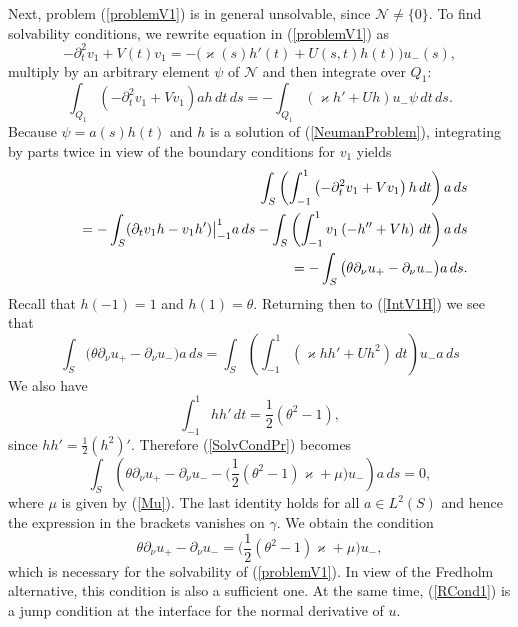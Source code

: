 \documentclass[graybox]{svmult}
\renewcommand{\kappa}{\varkappa}
\newcommand{\eqref}[1]{(\ref{#1})}
\newcommand{\pte}{\partial_t}
\begin{document}
Next, problem \eqref{problemV1} is in general unsolvable, since $\mathcal{N}\neq\{0\}$.  To find solvabi\-li\-ty conditions, we rewrite  equation in \eqref{problemV1} as
\begin{equation}\label{eqnV1Expand}
  -\pte^2 v_1+V(t)v_1=-\big(\kappa(s)h'(t)+U(s,t)h(t)\big)u_-(s),
\end{equation}
multiply  by an arbitrary element $\psi$ of  $\mathcal{N}$  and then integrate over $Q_1$:
\begin{equation}\label{IntV1H}
\int_{Q_1}\left(-\pte^2 v_1+Vv_1\right)ah\,dt\,ds=
-\int_{Q_1}(\kappa h'+Uh )u_-\psi\, dt\,ds.
\end{equation}
Because $\psi=a(s)h(t)$ and $h$ is a solution of \eqref{NeumanProblem}, integrating by parts twice  in view of the boundary conditions for $v_1$ yields
\begin{eqnarray}\nonumber
&&\int_{S} \left(\int_{-1}^1\left(-\pte^2 v_1+Vv_1\right)h\,dt \right) a\,ds\\\nonumber
&&\kern12pt=-\int_{S}( \partial_tv_1 h-v_1 h')\big|_{-1}^1a\,ds-
\int_{S} \left(\int_{-1}^1 v_1\left(-h''+Vh\right)\,dt \right) a\,ds\\\nonumber
&&\kern12pt=-\int_{S}\big(\theta\partial_\nu u_+-\partial_\nu u_-\big) a\,ds.
\end{eqnarray}
Recall that $h(-1)=1$ and $h(1)=\theta$. Returning then to \eqref{IntV1H} we see that
\begin{equation}\label{SolvCondPr}
\int_{S}\big(\theta\partial_\nu u_+-\partial_\nu u_-\big) a\,ds=
\int_{S} \left(\int_{-1}^1 \left(\kappa hh'+Uh^2\right)\,dt \right) u_-a\,ds
\end{equation}
We also have
$$
  \int_{-1}^1hh'\,d t=\textstyle\frac{1}{2 }(\theta^2-1),
$$
since $hh'=\frac12 (h^2)'$. Therefore \eqref{SolvCondPr} becomes
$$
\int_{S}\left(\theta\partial_\nu u_+-\partial_\nu u_--\big(\textstyle\frac{1}{2}(\theta^2-1)\kappa+\mu \big)u_-\right)a\,ds= 0,
$$
where $\mu$ is given by \eqref{Mu}.
The last identity holds for all $a\in L^2(S)$ and hence  the expression in the brackets vanishes on $\gamma$. We obtain  the  condition
\begin{equation}\label{RCond1}
  \theta\partial_\nu u_+-\partial_\nu u_-
=\big(\textstyle\frac{1}{2}(\theta^2-1)\kappa+\mu \big) u_-,
\end{equation}
which is necessary for the solvability of \eqref{problemV1}.
In view of the Fredholm alternative, this condition is also a sufficient one. At the same time, \eqref{RCond1} is a jump condition at the interface for the normal derivative of $u$.
\end{document}
